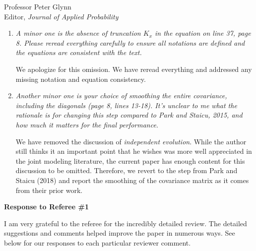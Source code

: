 \documentclass[11pt]{letter} %
\begin{document}
\begin{letter}{Professor
	Peter Glynn\\
	Editor, {\em Journal of Applied Probability}}
\begin{enumerate}
\vspace{5mm}
We apologize for this omission.  Upon original submission, we had a GitHub repository that included both our code and documentation.  We did not cite the repository simply because other journals ask for anonymous submissions which means the GitHub link needs to be removed.  Given JCGS does not require this, we have now cited the repository in the Appendix.  The GitHub repository has been improved to include better documentation to ensure users of our proposed method can properly implement our solution on their own problems. Again we apologize for not correcting this before originally submitting the article. We think the revision now meets the standards of JCGS papers in terms of user-friendly software.
\vspace{5mm}

\item {\it
A minor one is the absence of truncation $K_x$ in the equation on line 37, page 8. Please reread everything carefully to ensure all notations are defined and the equations are consistent with the text.}

\vspace{5mm}
We apologize for this omission. We have reread everything and addressed any missing notation and equation consistency.
\vspace{5mm}

\item {\it Another minor one is your choice of smoothing the entire covariance, including the diagonals (page 8, lines 13-18). It’s unclear to me what the rationale is for changing this step compared to Park and Staicu, 2015, and how much it matters for the final performance.}

\vspace{5mm}
We have removed the discussion of \emph{independent evolution}.  While the author still thinks it an important point that he wishes was more well appreciated in the joint modeling literature, the current paper has enough content for this discussion to be omitted.  Therefore, we revert to the step from Park and Staicu (2018) and report the smoothing of the covariance matrix as it comes from their prior work.
\vspace{5mm}

\end{enumerate}

\newpage
{\bf Response to Referee \#1}
\vspace{5mm}

I am very grateful to the referee for the incredibly detailed review.  The detailed suggestions and comments helped improve the paper in numerous ways.  See below for our responses to each particular reviewer comment.


\end{letter}
\end{document}
